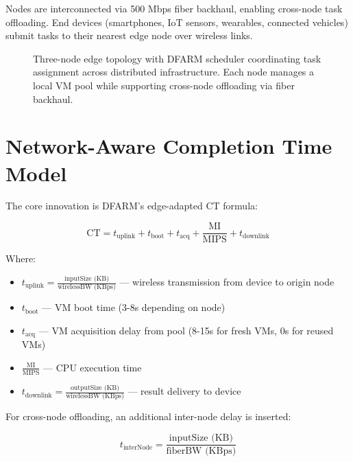 \documentclass[12pt]{report}
\begin{document}
Nodes are interconnected via 500 Mbps fiber backhaul, enabling cross-node task offloading. End devices (smartphones, IoT sensors, wearables, connected vehicles) submit tasks to their nearest edge node over wireless links.

\begin{figure}[H]
    \centering
    \caption{Three-node edge topology with DFARM scheduler coordinating task assignment across distributed infrastructure. Each node manages a local VM pool while supporting cross-node offloading via fiber backhaul.}
    \label{fig:architecture}
\end{figure}

\section{Network-Aware Completion Time Model}

The core innovation is DFARM's edge-adapted CT formula:

\begin{equation}
\text{CT} = t_{\text{uplink}} + t_{\text{boot}} + t_{\text{acq}} + \frac{\text{MI}}{\text{MIPS}} + t_{\text{downlink}}
\label{eq:ct_formula}
\end{equation}

Where:
\begin{itemize}
    \item $t_{\text{uplink}} = \frac{\text{inputSize (KB)}}{\text{wirelessBW (KBps)}}$ — wireless transmission from device to origin node
    \item $t_{\text{boot}}$ — VM boot time (3-8s depending on node)
    \item $t_{\text{acq}}$ — VM acquisition delay from pool (8-15s for fresh VMs, 0s for reused VMs)
    \item $\frac{\text{MI}}{\text{MIPS}}$ — CPU execution time
    \item $t_{\text{downlink}} = \frac{\text{outputSize (KB)}}{\text{wirelessBW (KBps)}}$ — result delivery to device
\end{itemize}

For cross-node offloading, an additional inter-node delay is inserted:

\begin{equation}
t_{\text{interNode}} = \frac{\text{inputSize (KB)}}{\text{fiberBW (KBps)}}
\end{equation}
\end{document}
